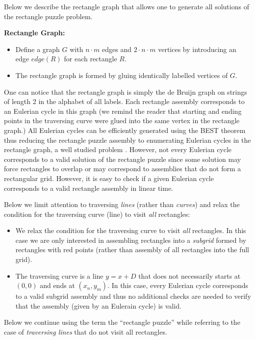 \documentclass[a4paper]{article}
\begin{document}
Below we describe the rectangle graph that allows one to generate all solutions of the rectangle puzzle problem. 

\textbf{Rectangle Graph:}
\begin{itemize}
\item  Define a graph $G$ with $n \cdot m$ edges and $2 \cdot n \cdot m$ vertices by introducing an edge $edge(R)$ for each rectangle $R$. 
\item The rectangle graph is formed by gluing identically labelled vertices of $G$.
\end{itemize}
One can notice that the rectangle graph is simply the de Bruijn graph on strings of length 2 in the alphabet of all labels. Each rectangle assembly corresponds to an Eulerian  cycle in this graph (we remind the reader that starting and ending points in the traversing curve were glued into the same vertex in the rectangle graph.) 
All 
Eulerian cycles  can be efficiently generated using the BEST \cite{best} theorem thus reducing the rectangle puzzle
assembly to enumerating Eulerian cycles in the rectangle graph, a well studied problem \cite{abrham80}. 
However, not every Eulerian cycle corresponds to a valid solution of the rectangle puzzle since some solution may force rectangles to overlap or may correspond to assemblies that do not form a rectangular grid. However, it is easy to check if a given Eulerian cycle corresponds to a valid rectangle assembly in linear time. 

Below we limit attention to traversing {\em lines} (rather than {\em curves})   and  relax the condition for the traversing curve (line) to visit  {\em all} rectangles: 
\begin{itemize} 
\item We relax the condition for the traversing curve to visit {\em all} rectangles.  In this case we are only interested in assembling  rectangles into a {\em subgrid}  formed by rectangles with red points (rather than assembly of all rectangles into the full grid). 
\item The traversing curve is a line $y=x+D$ that does not necessarily starts at $(0,0)$ and ends at $(x_n,y_m)$. In this case, every Eulerian cycle corresponds to a valid subgrid assembly and thus no additional checks are needed to verify that the assembly (given by an Eulerain cycle) is valid. 
\end{itemize}

Below we continue using the term the ``rectangle puzzle'' while referring to the case of \emph{traversing lines} that do not visit all rectangles. 
\end{document}
